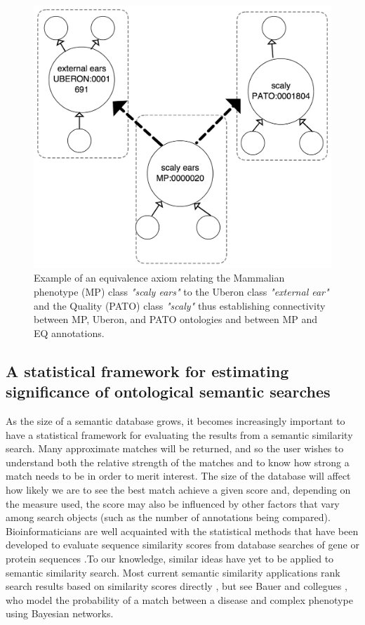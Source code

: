 \documentclass{article}
\begin{document}
\begin{figure}
\centering
\includegraphics[width=1\textwidth]{Equivalence.png}
\caption{\label{equivalence} Example of an equivalence axiom relating the Mammalian phenotype (MP) class \textit{"scaly ears"} to the Uberon class \textit{"external ear"} and the Quality (PATO) class \textit{"scaly"} thus establishing connectivity between MP, Uberon, and PATO ontologies and between MP and EQ annotations.}
\end{figure}



\subsection{A statistical framework for estimating significance of ontological semantic searches}

As the size of a semantic database grows, it becomes increasingly important to have a statistical framework for evaluating the results from a semantic similarity search. Many approximate matches will be returned, and so the user wishes to understand both the relative strength of the matches and to know how strong a match needs to be in order to merit interest. The size of the database will affect how likely we are to see the best match achieve a given score and, depending on the measure used, the score may also be influenced by other factors that vary among search objects (such as the number of annotations being compared). Bioinformaticians are well acquainted with the statistical methods that have been developed to evaluate sequence similarity scores from database searches of gene or protein sequences \cite{pearson1998empirical, altschul1997gapped}.To our knowledge, similar ideas have yet to be applied to semantic similarity search. Most current semantic similarity applications rank search results based on similarity scores directly \cite{washington2009linking, harispe2014semantic, smedley2013phenodigm}, but see Bauer and collegues \cite{bauer2012bayesian}, who model the probability of a match between a disease and complex phenotype using Bayesian networks.
\end{document}
